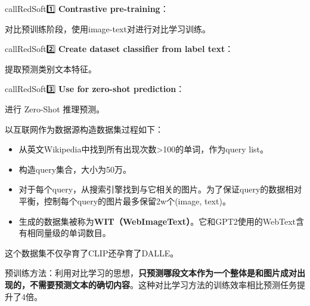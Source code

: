 \documentclass[zihao=false,fontset=windows]{ctexart}
\begin{document}
\begin{tcbraster}[raster columns=3, raster equal height=rows, raster column skip=9pt, raster row skip=8pt, raster left skip=0pt, raster right skip=0pt]
\begin{feishuboxnb}{callRedSoft}{1️⃣}
\textbf{Contrastive pre-training}：\par
对比预训练阶段，使用image-text对进行对比学习训练。\par
\end{feishuboxnb}
\begin{feishuboxnb}{callRedSoft}{2️⃣}
\textbf{Create dataset classifier from label text}：\par
提取预测类别文本特征。\par
\end{feishuboxnb}
\begin{feishuboxnb}{callRedSoft}{3️⃣}
\textbf{Use for zero-shot prediction}：\par
进行 Zero-Shot 推理预测。\par
\end{feishuboxnb}
\end{tcbraster}
\par\vspace{0.95em}\par\vspace{0.28em}
以互联网作为数据源构造数据集过程如下：\par
\begin{itemize}
\item 从英文Wikipedia中找到所有出现次数>100的单词，作为query list。
\item 构造query集合，大小为50万。
\item 对于每个query，从搜索引擎找到与它相关的图片。为了保证query的数据相对平衡，控制每个query的图片最多保留2w个(image, text)。
\item 生成的数据集被称为\textbf{WIT（WebImageText）}。它和GPT2使用的WebText含有相同量级的单词数目。
\end{itemize}
这个数据集不仅孕育了CLIP还孕育了DALLE。\par
\par\vspace{0.95em}\par\vspace{0.28em}
预训练方法：利用对比学习的思想，\textbf{只预测哪段文本作为一个整体是和图片成对出现的，不需要预测文本的确切内容}。这种对比学习方法的训练效率相比预测任务提升了4倍。\par
\end{document}
